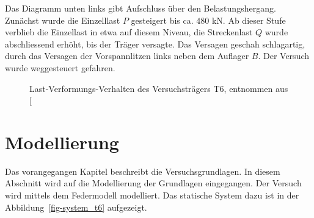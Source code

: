 \documentclass[
  11pt,
  letterpaper,
]{scrreprt}
\begin{document}
Das Diagramm unten links gibt Aufschluss über den Belastungshergang.
Zunächst wurde die Einzelllast \(P\) gesteigert bis ca. \(480\) kN. Ab
dieser Stufe verblieb die Einzellast in etwa auf diesem Niveau, die
Streckenlast \(Q\) wurde abschliessend erhöht, bis der Träger versagte.
Das Versagen geschah schlagartig, durch das Versagen der Vorspannlitzen
links neben dem Auflager \(B\). Der Versuch wurde weggesteuert gefahren.

\begin{figure}[H]


\caption{\label{fig-durchbiegung_t6}Last-Verformungs-Verhalten des
Versuchsträgers T6, entnommen aus
{[}\citeproc{ref-sigrist_versuche_1993}{5}{]}}

\end{figure}%

\section{Modellierung}\label{modellierung-2}

Das vorangegangen Kapitel beschreibt die Versuchsgrundlagen. In diesem
Abschnitt wird auf die Modellierung der Grundlagen eingegangen. Der
Versuch wird mittels dem Federmodell modelliert. Das statische System
dazu ist in der Abbildung~\ref{fig-system_t6} aufgezeigt.
\end{document}
